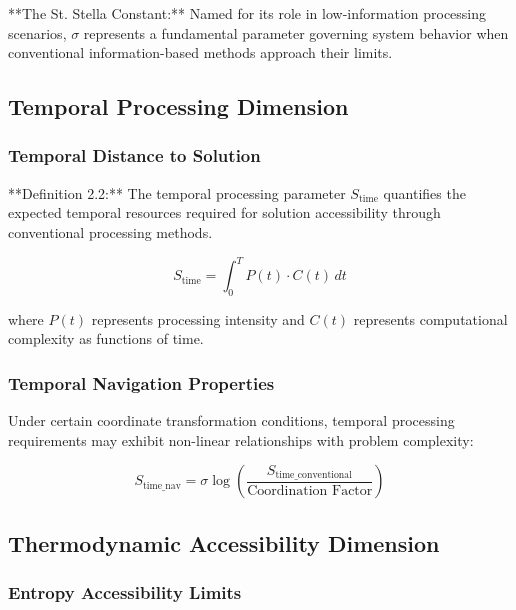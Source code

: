 \documentclass[12pt,a4paper]{article}
\begin{document}
**The St. Stella Constant:** Named for its role in low-information processing scenarios, $\sigma$ represents a fundamental parameter governing system behavior when conventional information-based methods approach their limits.

\subsection{Temporal Processing Dimension}

\subsubsection{Temporal Distance to Solution}

**Definition 2.2:** The temporal processing parameter $S_{\text{time}}$ quantifies the expected temporal resources required for solution accessibility through conventional processing methods.

\begin{equation}
S_{\text{time}} = \int_0^T P(t) \cdot C(t) \, dt
\label{eq:temporal_processing}
\end{equation}

where $P(t)$ represents processing intensity and $C(t)$ represents computational complexity as functions of time.

\subsubsection{Temporal Navigation Properties}

Under certain coordinate transformation conditions, temporal processing requirements may exhibit non-linear relationships with problem complexity:

\begin{equation}
S_{\text{time\_nav}} = \sigma \log\left(\frac{S_{\text{time\_conventional}}}{\text{Coordination Factor}}\right)
\label{eq:temporal_navigation}
\end{equation}

\subsection{Thermodynamic Accessibility Dimension}

\subsubsection{Entropy Accessibility Limits}
\end{document}
